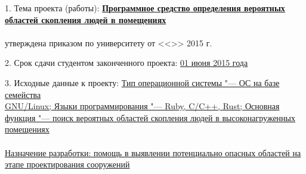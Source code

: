 {\begin{center}
  \end{center}

  \small{1. Тема проекта (работы):}
  \uline{\hspace{2em}\small{\textbf{Программное средство определения вероятных}}}\lineunderscore \\
  \uline{\small{\textbf{областей скопления людей в помещениях}}}\lineunderscore \\
  \\
  \small{утверждена приказом по университету от \hspace*{0.7em} <<\uline{\hspace*{0.7em}\diplomaTaskTopicOrderDay\hspace*{0.7em}}>> \uline{\hspace*{0.7em}\diplomaTaskTopicOrderMonth\hspace*{0.7em}} 2015 г. \hspace*{0.7em} \No{} \uline{\hspace*{0.7em}\diplomaTaskTopicOrderNo\hspace*{\fill}}}

  \vspace{0.7em}

  \small{2. Срок сдачи студентом законченного проекта: \uline{\hspace{1em}01 июня 2015 года}}\lineunderscore

  \vspace{0.7em}

  \small{3. Исходные данные к проекту:}
  \small{\uline{\hspace{1em}Тип операционной системы "--- ОС на базе семейства}}\lineunderscore \\
  \small{\uline{GNU/Linux; Языки программирования "--- Ruby, C/C++, Rust;
  Основная функция "--- поиск ве\-ро\-ят\-ных областей скопления людей в высоконагруженных помещениях}}\lineunderscore \\
  \lineunderscore \\
  \small{\uline{Назначение разработки: помощь в выявлении потенциально опасных областей на этапе про\-екти\-ро\-ва\-ния сооружений}}\lineunderscore \\
  \lineunderscore \\

}
